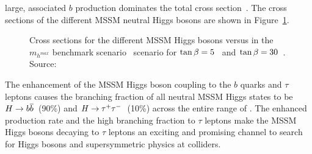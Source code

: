 large, associated $b$ production dominates the total cross section~\cite{LHCHiggsXSecGroup}. The cross sections of the different MSSM
neutral Higgs bosons are shown in Figure~\ref{fig:MSSMXSectionsTanBeta}.
\begin{figure}
  \centering
  \caption[MSSM Higgs boson cross sections at the LHC]{Cross sections for the
  different MSSM Higgs bosons versus \ma in the $m_{h^{max}}$ benchmark
  scenario~\cite{MHMaxBenchmark} scenario for
  $\tan\beta=5$~ and
  $\tan\beta=30$~.  Source:~\cite{LHCHiggsXSecGroup}
  }
  \label{fig:MSSMXSectionsTanBeta}
\end{figure}
The \tanb enhancement of the MSSM Higgs boson coupling to the $b$ quarks and $\tau$
leptons causes the branching fraction of all neutral MSSM Higgs states to be
$H\to{b\overline{b}}$~(90\%) and $H\to\tau^+\tau^-$~(10\%) across the entire range of \ma.  The
enhanced production rate and the high branching fraction to $\tau$ leptons make
the MSSM Higgs bosons decaying to $\tau$ leptons an exciting and promising channel to
search for Higgs bosons and supersymmetric physics at colliders.

